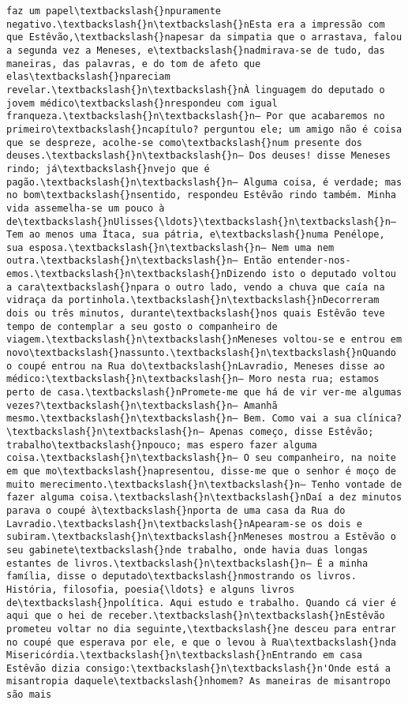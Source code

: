 \documentclass[11pt]{article}
\begin{document}
\begin{Verbatim}[commandchars=\\\{\}]
faz um papel\textbackslash{}npuramente negativo.\textbackslash{}n\textbackslash{}nEsta era a impressão com que Estêvão,\textbackslash{}napesar da simpatia que o arrastava, falou a segunda vez a Meneses, e\textbackslash{}nadmirava-se de tudo, das maneiras, das palavras, e do tom de afeto que elas\textbackslash{}npareciam revelar.\textbackslash{}n\textbackslash{}nÀ linguagem do deputado o jovem médico\textbackslash{}nrespondeu com igual franqueza.\textbackslash{}n\textbackslash{}n— Por que acabaremos no primeiro\textbackslash{}ncapítulo? perguntou ele; um amigo não é coisa que se despreze, acolhe-se como\textbackslash{}num presente dos deuses.\textbackslash{}n\textbackslash{}n— Dos deuses! disse Meneses rindo; já\textbackslash{}nvejo que é pagão.\textbackslash{}n\textbackslash{}n— Alguma coisa, é verdade; mas no bom\textbackslash{}nsentido, respondeu Estêvão rindo também. Minha vida assemelha-se um pouco à de\textbackslash{}nUlisses{\ldots}\textbackslash{}n\textbackslash{}n— Tem ao menos uma Ítaca, sua pátria, e\textbackslash{}numa Penélope, sua esposa.\textbackslash{}n\textbackslash{}n— Nem uma nem outra.\textbackslash{}n\textbackslash{}n— Então entender-nos-emos.\textbackslash{}n\textbackslash{}nDizendo isto o deputado voltou a cara\textbackslash{}npara o outro lado, vendo a chuva que caía na vidraça da portinhola.\textbackslash{}n\textbackslash{}nDecorreram dois ou três minutos, durante\textbackslash{}nos quais Estêvão teve tempo de contemplar a seu gosto o companheiro de viagem.\textbackslash{}n\textbackslash{}nMeneses voltou-se e entrou em novo\textbackslash{}nassunto.\textbackslash{}n\textbackslash{}nQuando o coupé entrou na Rua do\textbackslash{}nLavradio, Meneses disse ao médico:\textbackslash{}n\textbackslash{}n— Moro nesta rua; estamos perto de casa.\textbackslash{}nPromete-me que há de vir ver-me algumas vezes?\textbackslash{}n\textbackslash{}n— Amanhã mesmo.\textbackslash{}n\textbackslash{}n— Bem. Como vai a sua clínica?\textbackslash{}n\textbackslash{}n— Apenas começo, disse Estêvão; trabalho\textbackslash{}npouco; mas espero fazer alguma coisa.\textbackslash{}n\textbackslash{}n— O seu companheiro, na noite em que mo\textbackslash{}napresentou, disse-me que o senhor é moço de muito merecimento.\textbackslash{}n\textbackslash{}n— Tenho vontade de fazer alguma coisa.\textbackslash{}n\textbackslash{}nDaí a dez minutos parava o coupé à\textbackslash{}nporta de uma casa da Rua do Lavradio.\textbackslash{}n\textbackslash{}nApearam-se os dois e subiram.\textbackslash{}n\textbackslash{}nMeneses mostrou a Estêvão o seu gabinete\textbackslash{}nde trabalho, onde havia duas longas estantes de livros.\textbackslash{}n\textbackslash{}n— É a minha família, disse o deputado\textbackslash{}nmostrando os livros. História, filosofia, poesia{\ldots} e alguns livros de\textbackslash{}npolítica. Aqui estudo e trabalho. Quando cá vier é aqui que o hei de receber.\textbackslash{}n\textbackslash{}nEstêvão prometeu voltar no dia seguinte,\textbackslash{}ne desceu para entrar no coupé que esperava por ele, e que o levou à Rua\textbackslash{}nda Misericórdia.\textbackslash{}n\textbackslash{}nEntrando em casa Estêvão dizia consigo:\textbackslash{}n\textbackslash{}n'Onde está a misantropia daquele\textbackslash{}nhomem? As maneiras de misantropo são mais 
\end{Verbatim}
\end{document}

